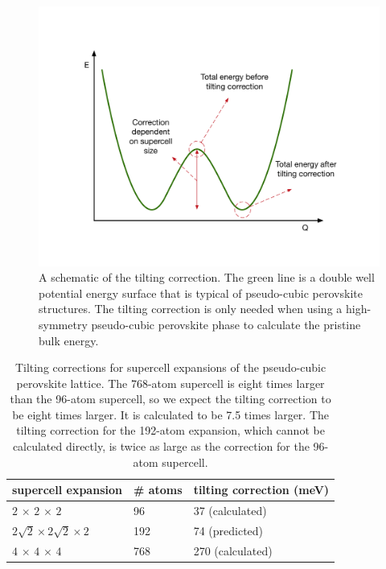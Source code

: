 \begin{figure}[h!]   
\centering
  \includegraphics[width=0.8\columnwidth]{figures/ch6/tilting_correction.png}
  \caption[Tilting correction for the pseudo-cubic perovskite lattice]{A schematic of the tilting correction. The green line is a double well potential energy surface that is typical of pseudo-cubic perovskite structures. The tilting correction is only needed when using a high-symmetry pseudo-cubic perovskite phase to calculate the pristine bulk energy.}
\label{tilting_correction}
\end{figure}

\begin{table}[h!]\centering
\begin{tabular}{lll}\toprule
supercell expansion&\# atoms&tilting correction (meV) \\ 
\midrule
$2\,\times\,2\,\times\,2$ & 96 & 37 (calculated) \\
$2\sqrt2\times2\sqrt2\times2$ & 192 & 74 (predicted) \\
$4\,\times\,4\,\times\,4$ & 768 & 270 (calculated) \\
\bottomrule
\end{tabular} 
\caption[Tilting corrections for supercell expansions of the pseudo-cubic perovskite lattice]{\label{modemaptable} Tilting corrections for supercell expansions of the pseudo-cubic perovskite lattice. The 768-atom supercell is eight times larger than the 96-atom supercell, so we expect the tilting correction to be eight times larger. It is calculated to be 7.5 times larger. The tilting correction for the 192-atom expansion, which cannot be calculated directly, is twice as large as the correction for the 96-atom supercell. }
\end{table}

